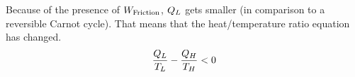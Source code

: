 Because of the presence of $W_{\text{Friction}}$, $Q_{L}$ gets smaller (in comparison to a reversible Carnot cycle).
That means that the heat/temperature ratio equation has changed.
\begin{equation*}
  \frac{Q_{L}}{T_{L}} - \frac{Q_{H}}{T_{H}} < 0
\end{equation*}

